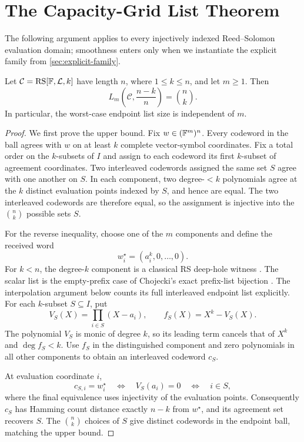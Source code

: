 \section{The Capacity-Grid List Theorem}

The following argument applies to every injectively indexed Reed--Solomon
evaluation domain; smoothness enters only when we instantiate the explicit
family from \cref{sec:explicit-family}.

\begin{theorem}
\label{thm:capacity-grid-exact}
Let \(\mathcal C=\operatorname{RS}[\mathbb{F},\mathcal L,k]\) have length \(n\), where
\(1\le k\le n\), and let \(m\ge1\).  Then
\[
  L_m\left(\mathcal C,\frac{n-k}{n}\right)=\binom nk .
\]
In particular, the worst-case endpoint list size is independent of \(m\).
\end{theorem}

\begin{proof}
We first prove the upper bound.  Fix \(w\in(\mathbb{F}^m)^n\).
Every codeword in the ball agrees with \(w\) on at least \(k\) complete
vector-symbol coordinates.  Fix a total order on the \(k\)-subsets of \(I\)
and assign to each codeword its first \(k\)-subset of agreement coordinates.
Two interleaved codewords assigned the same set \(S\) agree with one another
on \(S\).  In each component, two degree-\(<k\) polynomials agree at the \(k\)
distinct evaluation points indexed by \(S\), and hence are equal.  The two
interleaved codewords are therefore equal, so the assignment is injective
into the \(\binom nk\) possible sets \(S\).

For the reverse inequality, choose one of the \(m\) components and define the
received word
\[
  w_i^\star=(a_i^k,0,\ldots,0).
\]
For \(k<n\), the degree-\(k\) component is a classical RS deep-hole
witness \cite[Section~2]{ketiWan2016deepHoles}. The scalar list is the
empty-prefix case of Chojecki's exact prefix-list bijection
\cite[Section~4]{chojecki2026thresholds}. The interpolation argument below
counts its full interleaved endpoint list explicitly.
For each \(k\)-subset \(S\subseteq I\), put
\[
  V_S(X)=\prod_{i\in S}(X-a_i),
  \qquad
  f_S(X)=X^k-V_S(X).
\]
The polynomial \(V_S\) is monic of degree \(k\), so its leading term cancels
that of \(X^k\) and \(\deg f_S<k\).  Use \(f_S\) in the distinguished
component and zero polynomials in all other components to obtain an
interleaved codeword \(c_S\).

At evaluation coordinate \(i\),
\[
  c_{S,i}=w_i^\star
  \quad\Longleftrightarrow\quad
  V_S(a_i)=0
  \quad\Longleftrightarrow\quad
  i\in S,
\]
where the final equivalence uses injectivity of the evaluation points.
Consequently \(c_S\) has Hamming count distance exactly \(n-k\) from
\(w^\star\), and its agreement set recovers \(S\).  The \(\binom nk\) choices
of \(S\) give distinct codewords in the endpoint ball, matching the upper bound.
\end{proof}

